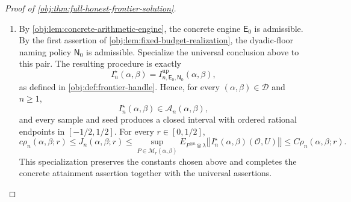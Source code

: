 \begin{proof}[Proof of \cref{obj:thm:full-honest-frontier-solution}]
\begin{enumerate}
\item By \cref{obj:lem:concrete-arithmetic-engine}, the concrete engine
\(\mathsf E_0\) is admissible. By the first assertion of
\cref{obj:lem:fixed-budget-realization}, the dyadic-floor naming policy
\(\mathsf N_0\) is admissible. Specialize the universal conclusion above
to this pair. The resulting procedure is exactly
\[
I_n^\star(\alpha,\beta)
=
I^{\mathrm{up}}_{n,\mathsf E_0,\mathsf N_0}(\alpha,\beta),
\]
as defined in \cref{obj:def:frontier-handle}. Hence, for every
\((\alpha,\beta)\in\mathcal D\) and \(n\ge1\),
\[
I_n^\star(\alpha,\beta)\in\mathcal A_n(\alpha,\beta),
\]
and every sample and seed produces a closed interval with ordered
rational endpoints in \([-1/2,1/2]\). For every \(r\in[0,1/2]\),
\[
c\rho_n(\alpha,\beta;r)
\le J_n(\alpha,\beta;r)
\le
\sup_{P\in\mathcal M_r(\alpha,\beta)}
E_{P^{\otimes n}\otimes\lambda}
\bigl[|I_n^\star(\alpha,\beta)(\mathcal O,U)|\bigr]
\le C\rho_n(\alpha,\beta;r).
\]
This specialization preserves the constants chosen above and completes
the concrete attainment assertion together with the universal assertions.
\end{enumerate}
\end{proof}
